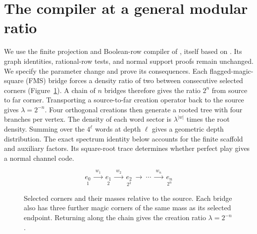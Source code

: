 \section{The compiler at a general modular ratio}\label{sec:compiler}
We use the finite projection and Boolean-row compiler of \cite[Section~4]{Sigma2}, itself based on \cite{Entropy}. Its graph identities, rational-row tests, and normal support proofs remain unchanged. We specify the parameter change and prove its consequences. Each flagged-magic-square (FMS) bridge forces a density ratio of two between consecutive selected corners (Figure~\ref{fig:chain}).
A chain of $n$ bridges therefore gives the ratio $2^n$ from source to far corner.
Transporting a source-to-far creation operator back to the source gives $\lambda=2^{-n}$.
Four orthogonal creations then generate a rooted tree with four branches per vertex.
The density of each word sector is $\lambda^{|w|}$ times the root density.
Summing over the $4^\ell$ words at depth $\ell$ gives a geometric depth distribution.
The exact spectrum identity below accounts for the finite scaffold and auxiliary factors.
Its square-root trace determines whether perfect play gives a normal channel code.

\begin{figure}[ht]
\centering
\[
 \underset{1}{e_0}\ \xrightarrow{\ w_1\ }\
 \underset{2}{e_1}\ \xrightarrow{\ w_2\ }\
 \underset{2^2}{e_2}\ \longrightarrow\ \cdots\
 \xrightarrow{\ w_n\ }\ \underset{2^n}{e_n}
\]
\caption{Selected corners and their masses relative to the source. Each bridge also has three further magic corners of the same mass as its selected endpoint. Returning along the chain gives the creation ratio $\lambda=2^{-n}$.}
\label{fig:chain}
\end{figure}

